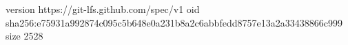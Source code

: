 version https://git-lfs.github.com/spec/v1
oid sha256:e75931a992874c095c5b648e0a231b8a2c6abbfedd8757e13a2a33438866c999
size 2528
